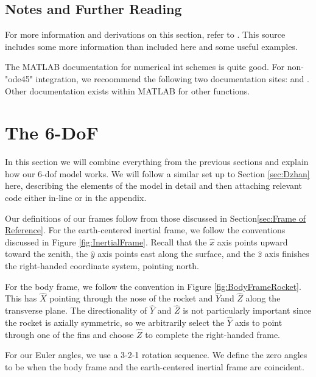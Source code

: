 \documentclass[12pt]{report}
\begin{document}
\section{Notes and Further Reading}
For more information and derivations on this section, refer to \cite{trench_31_2020}. This source includes some more information than included here and some useful examples.

The MATLAB documentation for \gls{numerical int} schemes is quite good. For non-"ode45" integration, we recoommend the following two documentation sites: \cite{mathworks_choose_2024} and \cite{mathworks_summary_2024}. Other documentation exists within MATLAB for other functions.

\chapter{The 6-DoF}
In this section we will combine everything from the previous sections and explain how our 6-\gls{dof} model works. We will follow a similar set up to Section \ref{sec:Dzhan}  here, describing the elements of the model in detail and then attaching relevant code either in-line or in the appendix.

Our definitions of our frames follow from those discussed in Section\ref{sec:Frame of Reference}. For the earth-centered \gls{inertial frame}, we follow the conventions discussed in Figure \ref{fig:InertialFrame}. Recall that the $\hat{x}$ axis points upward toward the zenith, the $\hat{y}$ axis points east along the surface, and the $\hat{z}$ axis finishes the right-handed coordinate system, pointing north.

For the \gls{body frame}, we follow the convention in Figure \ref{fig:BodyFrameRocket}. This has $\hat{X}$ pointing through the nose of the rocket and $\hat{Y}$and $\hat{Z}$ along the transverse plane. The directionality of $\hat{Y}$ and $\hat{Z}$ is not particularly important since the rocket is axially symmetric, so we arbitrarily select the $\hat{Y}$ axis to point through one of the fins and choose $\hat{Z}$ to complete the right-handed frame.

For our \gls{Euler angles}, we use a 3-2-1 rotation sequence. We define the zero angles to be when the \gls{body frame} and the earth-centered \gls{inertial frame} are coincident.
\end{document}
